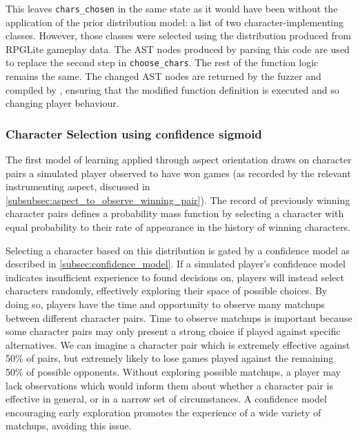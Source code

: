 This leaves \lstinline{chars_chosen} in the same state as it would have been
without the application of the prior distribution model: a list of two
character-implementing classes. However, those classes were selected using the
distribution produced from RPGLite gameplay data. The AST nodes produced by
parsing this code are used to replace the second step in
\lstinline{choose_chars}. The rest of the function logic remains the same. The
changed AST nodes are returned by the fuzzer and compiled by \pdsfthree{}, ensuring
that the modified function definition is executed and so changing player
behaviour.



\subsubsection{Character Selection using confidence sigmoid}
\label{subsubsec:learning_by_picking_from_distribution_of_wins_with_confidence}

The first model of learning applied through aspect orientation draws on
character pairs a simulated player observed to have won games (as recorded by
the relevant instrumenting aspect, discussed in
\cref{subsubsec:aspect_to_observe_winning_pair}). The record of previously
winning character pairs defines a probability mass function by selecting a
character with equal probability to their rate of appearance in the history of
winning characters.

Selecting a character based on this distribution is gated by a confidence model
as described in \cref{subsec:confidence_model}. If a simulated player's
confidence model indicates insufficient experience to found decisions on,
players will instead select characters randomly, effectively exploring their
space of possible choices. By doing so, players have the time and opportunity to
observe many matchups between different character pairs. Time to observe
matchups is important because some character pairs may only present a strong
choice if played against specific alternatives. We can imagine a character pair
which is extremely effective against 50\% of pairs, but extremely likely to lose
games played against the remaining 50\% of possible opponents. Without exploring
possible matchups, a player may lack observations which would inform them about
whether a character pair is effective in general, or in a narrow set of
circumstances. A confidence model encouraging early exploration promotes the
experience of a wide variety of matchups, avoiding this issue.

